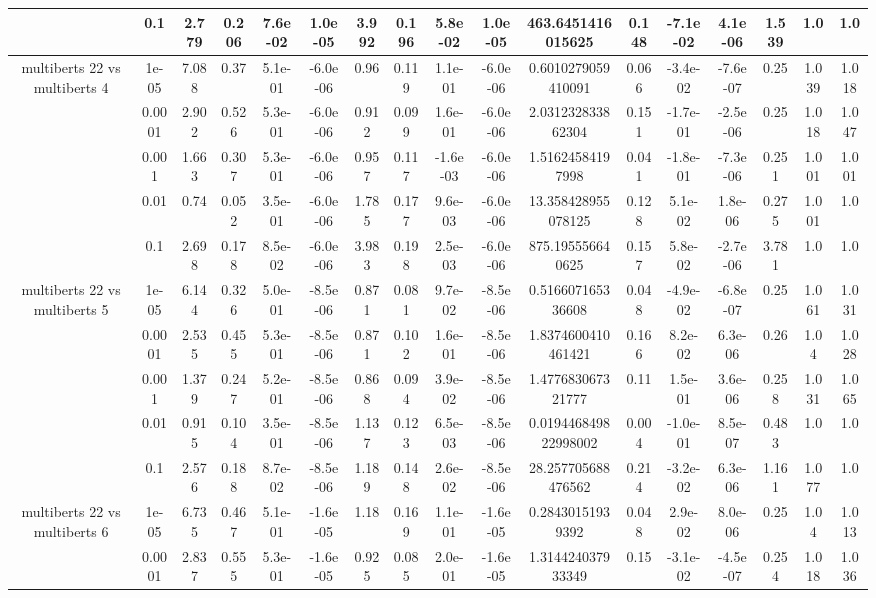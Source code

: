 \begin{tabular}{|c|c|c|c|c|c|c|c|c|c|c|c|c|c|c|c|c|}
 & 0.1 & 2.779 & 0.206 & 7.6e-02 & 1.0e-05 & 3.992 & 0.196 & 5.8e-02 & 1.0e-05 & 463.6451416015625 & 0.148 & -7.1e-02 & 4.1e-06 & 1.539 & 1.0 & 1.0 \\
\hline
\multirow{5}{*}{multiberts 22 vs multiberts 4} & 1e-05 & 7.088 & 0.37 & 5.1e-01 & -6.0e-06 & 0.96 & 0.119 & 1.1e-01 & -6.0e-06 & 0.6010279059410091 & 0.066 & -3.4e-02 & -7.6e-07 & 0.25 & 1.039 & 1.018 \\
 & 0.0001 & 2.902 & 0.526 & 5.3e-01 & -6.0e-06 & 0.912 & 0.099 & 1.6e-01 & -6.0e-06 & 2.031232833862304 & 0.151 & -1.7e-01 & -2.5e-06 & 0.25 & 1.018 & 1.047 \\
 & 0.001 & 1.663 & 0.307 & 5.3e-01 & -6.0e-06 & 0.957 & 0.117 & -1.6e-03 & -6.0e-06 & 1.51624584197998 & 0.041 & -1.8e-01 & -7.3e-06 & 0.251 & 1.001 & 1.001 \\
 & 0.01 & 0.74 & 0.052 & 3.5e-01 & -6.0e-06 & 1.785 & 0.177 & 9.6e-03 & -6.0e-06 & 13.358428955078125 & 0.128 & 5.1e-02 & 1.8e-06 & 0.275 & 1.001 & 1.0 \\
 & 0.1 & 2.698 & 0.178 & 8.5e-02 & -6.0e-06 & 3.983 & 0.198 & 2.5e-03 & -6.0e-06 & 875.195556640625 & 0.157 & 5.8e-02 & -2.7e-06 & 3.781 & 1.0 & 1.0 \\
\hline
\multirow{5}{*}{multiberts 22 vs multiberts 5} & 1e-05 & 6.144 & 0.326 & 5.0e-01 & -8.5e-06 & 0.871 & 0.081 & 9.7e-02 & -8.5e-06 & 0.516607165336608 & 0.048 & -4.9e-02 & -6.8e-07 & 0.25 & 1.061 & 1.031 \\
 & 0.0001 & 2.535 & 0.455 & 5.3e-01 & -8.5e-06 & 0.871 & 0.102 & 1.6e-01 & -8.5e-06 & 1.8374600410461421 & 0.166 & 8.2e-02 & 6.3e-06 & 0.26 & 1.04 & 1.028 \\
 & 0.001 & 1.379 & 0.247 & 5.2e-01 & -8.5e-06 & 0.868 & 0.094 & 3.9e-02 & -8.5e-06 & 1.477683067321777 & 0.11 & 1.5e-01 & 3.6e-06 & 0.258 & 1.031 & 1.065 \\
 & 0.01 & 0.915 & 0.104 & 3.5e-01 & -8.5e-06 & 1.137 & 0.123 & 6.5e-03 & -8.5e-06 & 0.019446849822998002 & 0.004 & -1.0e-01 & 8.5e-07 & 0.483 & 1.0 & 1.0 \\
 & 0.1 & 2.576 & 0.188 & 8.7e-02 & -8.5e-06 & 1.189 & 0.148 & 2.6e-02 & -8.5e-06 & 28.257705688476562 & 0.214 & -3.2e-02 & 6.3e-06 & 1.161 & 1.077 & 1.0 \\
\hline
\multirow{5}{*}{multiberts 22 vs multiberts 6} & 1e-05 & 6.735 & 0.467 & 5.1e-01 & -1.6e-05 & 1.18 & 0.169 & 1.1e-01 & -1.6e-05 & 0.28430151939392 & 0.048 & 2.9e-02 & 8.0e-06 & 0.25 & 1.04 & 1.013 \\
 & 0.0001 & 2.837 & 0.555 & 5.3e-01 & -1.6e-05 & 0.925 & 0.085 & 2.0e-01 & -1.6e-05 & 1.314424037933349 & 0.15 & -3.1e-02 & -4.5e-07 & 0.254 & 1.018 & 1.036 \\

\end{tabular}
